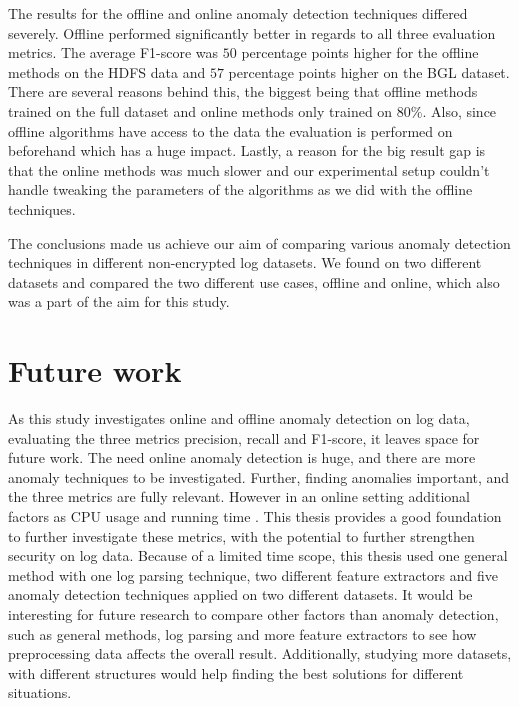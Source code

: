 The results for the offline and online anomaly detection techniques differed severely. Offline performed significantly better in regards to all three evaluation metrics. The average F1-score was $50$ percentage points higher for the offline methods on the HDFS data and $57$ percentage points higher on the BGL dataset. There are several reasons behind this, the biggest being that offline methods trained on the full dataset and online methods only trained on $80$\%. Also, since offline algorithms have access to the data the evaluation is performed on beforehand which has a huge impact. Lastly, a reason for the big result gap is that the online methods was much slower and our experimental setup couldn't handle tweaking the parameters of the algorithms as we did with the offline techniques.  

The conclusions made us achieve our aim of comparing various anomaly detection techniques in different non-encrypted log datasets. We found  on two different datasets and compared the two different use cases, offline and online, which also was a part of the aim for this study.

\section{Future work}
As this study investigates online and offline anomaly detection on log data, evaluating the three metrics precision, recall and F1-score, it leaves space for future work. The need  online anomaly detection is huge, and there are more anomaly  techniques to be investigated. Further, finding anomalies  important, and the three metrics are fully relevant. However in an online setting additional factors as CPU usage and running time . This thesis provides a good foundation to further investigate these metrics, with the potential to further strengthen security on log data. 
Because of a limited time scope, this thesis used one general method with one log parsing technique, two different feature extractors and five anomaly detection techniques applied on two different datasets. It would be interesting for future research to compare other factors than anomaly detection, such as general methods, log parsing and more feature extractors to see how preprocessing data affects the overall result. Additionally, studying more datasets, with different structures would help  finding the best solutions for different situations. 


